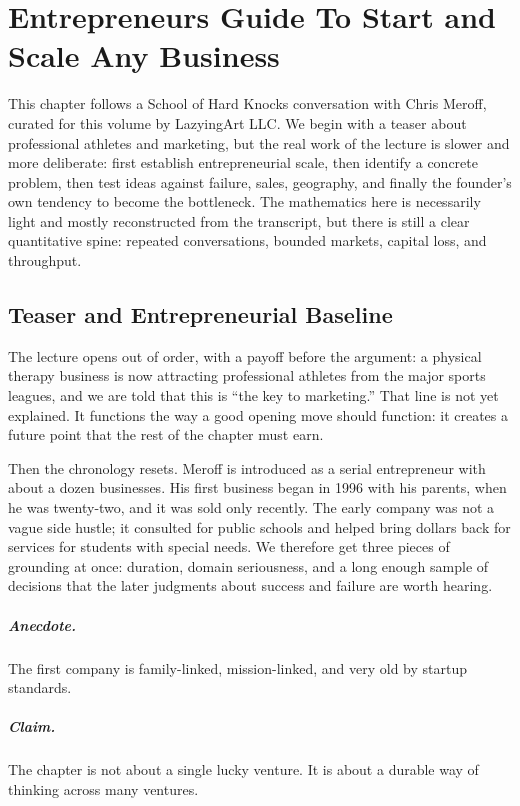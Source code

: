 \chapter{Entrepreneurs Guide To Start and Scale Any Business}

This chapter follows a School of Hard Knocks conversation with Chris Meroff, curated for this volume by LazyingArt LLC. We begin with a teaser about professional athletes and marketing, but the real work of the lecture is slower and more deliberate: first establish entrepreneurial scale, then identify a concrete problem, then test ideas against failure, sales, geography, and finally the founder's own tendency to become the bottleneck. The mathematics here is necessarily light and mostly reconstructed from the transcript, but there is still a clear quantitative spine: repeated conversations, bounded markets, capital loss, and throughput.

\section{Teaser and Entrepreneurial Baseline}

The lecture opens out of order, with a payoff before the argument: a physical therapy business is now attracting professional athletes from the major sports leagues, and we are told that this is ``the key to marketing.'' That line is not yet explained. It functions the way a good opening move should function: it creates a future point that the rest of the chapter must earn.

Then the chronology resets. Meroff is introduced as a serial entrepreneur with about a dozen businesses. His first business began in 1996 with his parents, when he was twenty-two, and it was sold only recently. The early company was not a vague side hustle; it consulted for public schools and helped bring dollars back for services for students with special needs. We therefore get three pieces of grounding at once: duration, domain seriousness, and a long enough sample of decisions that the later judgments about success and failure are worth hearing.

\paragraph{Anecdote.}
The first company is family-linked, mission-linked, and very old by startup standards.

\paragraph{Claim.}
The chapter is not about a single lucky venture. It is about a durable way of thinking across many ventures.


